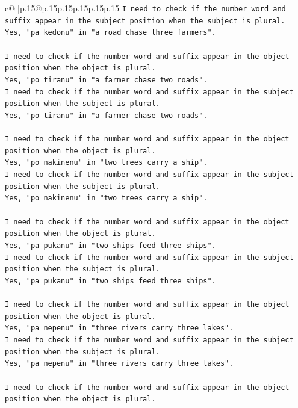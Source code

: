 \documentclass{article}
\begin{document}
{\begin{supertabular}{c@{$\;$}|p{.15\linewidth}@{}p{.15\linewidth}p{.15\linewidth}p{.15\linewidth}p{.15\linewidth}p{.15\linewidth}}
{{{\texttt{I need to check if the number word and suffix appear in the subject position when the subject is plural.} \\
\texttt{Yes, "pa kedonu" in "a road chase three farmers".} \\
\\ 
\texttt{I need to check if the number word and suffix appear in the object position when the object is plural.} \\
\texttt{Yes, "po tiranu" in "a farmer chase two roads".} \\
\texttt{I need to check if the number word and suffix appear in the subject position when the subject is plural.} \\
\texttt{Yes, "po tiranu" in "a farmer chase two roads".} \\
\\ 
\texttt{I need to check if the number word and suffix appear in the object position when the object is plural.} \\
\texttt{Yes, "po nakinenu" in "two trees carry a ship".} \\
\texttt{I need to check if the number word and suffix appear in the subject position when the subject is plural.} \\
\texttt{Yes, "po nakinenu" in "two trees carry a ship".} \\
\\ 
\texttt{I need to check if the number word and suffix appear in the object position when the object is plural.} \\
\texttt{Yes, "pa pukanu" in "two ships feed three ships".} \\
\texttt{I need to check if the number word and suffix appear in the subject position when the subject is plural.} \\
\texttt{Yes, "pa pukanu" in "two ships feed three ships".} \\
\\ 
\texttt{I need to check if the number word and suffix appear in the object position when the object is plural.} \\
\texttt{Yes, "pa nepenu" in "three rivers carry three lakes".} \\
\texttt{I need to check if the number word and suffix appear in the subject position when the subject is plural.} \\
\texttt{Yes, "pa nepenu" in "three rivers carry three lakes".} \\
\\ 
\texttt{I need to check if the number word and suffix appear in the object position when the object is plural.} \\
}}}
\end{supertabular}}
\end{document}
